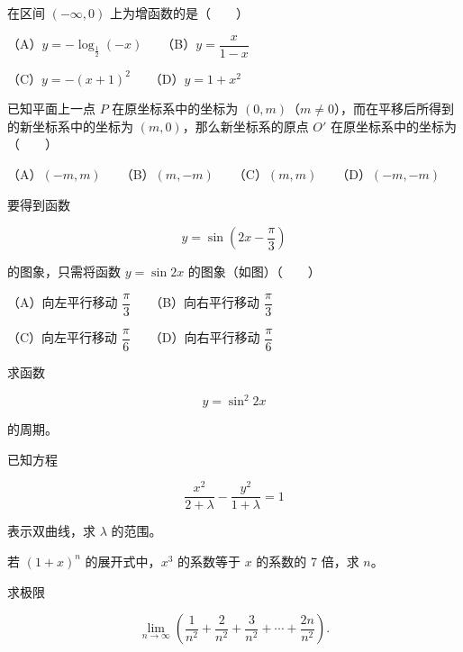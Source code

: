 \begin{question}
在区间 $(-\infty,0)$ 上为增函数的是\mbox{（　　）}

（A）$y=-\log_{\frac12}(-x)$　　（B）$y=\dfrac{x}{1-x}$

（C）$y=-(x+1)^2$　　（D）$y=1+x^2$

\end{question}
\begin{question}
已知平面上一点 $P$ 在原坐标系中的坐标为 $(0,m)$（$m\ne0$），而在平移后所得到的新坐标系中的坐标为 $(m,0)$，那么新坐标系的原点 $O'$ 在原坐标系中的坐标为\mbox{（　　）}

（A）$(-m,m)$　　（B）$(m,-m)$　　（C）$(m,m)$　　（D）$(-m,-m)$

\Needspace{0.4\textheight}
\end{question}
\begin{question}
要得到函数

\nopagebreak[4]
\[
y=\sin\left(2x-\frac\pi3\right)
\]

的图象，只需将函数 $y=\sin2x$ 的图象（如图）\mbox{（　　）}
\nopagebreak[4]
\begin{center}\end{center}
\nopagebreak[4]
（A）向左平行移动 $\dfrac\pi3$　　（B）向右平行移动 $\dfrac\pi3$

（C）向左平行移动 $\dfrac\pi6$　　（D）向右平行移动 $\dfrac\pi6$

\end{question}
\begin{question}
求函数

\nopagebreak[4]
\[
y=\sin^2 2x
\]

的周期。

\end{question}
\begin{question}
已知方程

\nopagebreak[4]
\[
\frac{x^2}{2+\lambda}-\frac{y^2}{1+\lambda}=1
\]

表示双曲线，求 $\lambda$ 的范围。

\end{question}
\begin{question}
若 $(1+x)^n$ 的展开式中，$x^3$ 的系数等于 $x$ 的系数的 7 倍，求 $n$。

\end{question}
\begin{question}
求极限

\nopagebreak[4]
\[
\lim_{n\to\infty}\left(\frac1{n^2}+\frac2{n^2}+\frac3{n^2}+\cdots+\frac{2n}{n^2}\right).
\]

\end{question}
